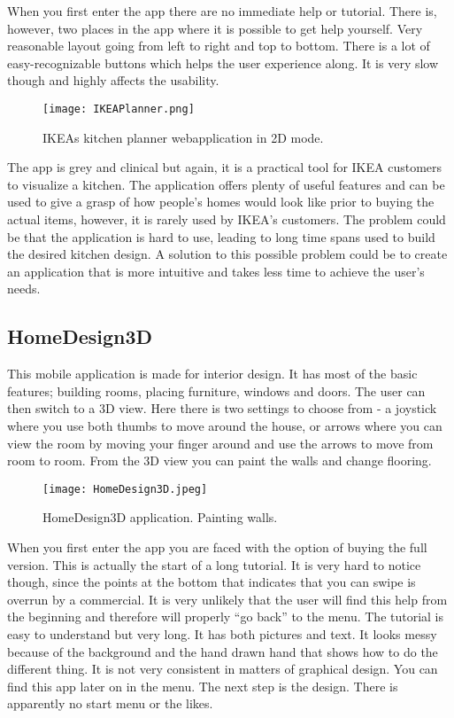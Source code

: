 When you first enter the app there are no immediate help or tutorial. There is, however, two places in the app where it is possible to get help yourself. Very reasonable layout going from left to right and top to bottom.  There is a lot of easy-recognizable buttons which helps the user experience along. 
It is very slow though and highly affects the usability. 

\begin{figure}[H]
\centering
\texttt{[image: IKEAPlanner.png]}
\caption{IKEAs kitchen planner webapplication in 2D mode.}
\end{figure}

The app is grey and clinical but again, it is a practical tool for IKEA customers to visualize a kitchen. 
The application offers plenty of useful features and can be used to give a grasp of how people’s homes would look like prior to buying the actual items, however, it is rarely used by IKEA’s customers. The problem could be that the application is hard to use, leading to long time spans used to build the desired kitchen design. A solution to this possible problem could be to create an application that is more intuitive and takes less time to achieve the user’s needs.

\subsection{HomeDesign3D}
This mobile application is made for interior design. It has most of the basic features; building rooms, placing furniture, windows and doors. The user can then switch to a 3D view. Here there is two settings to choose from - a joystick where you use both thumbs to move around the house, or arrows where you can view the room by moving your finger around and use the arrows to move from room to room. From the 3D view you can paint the walls and change flooring.

\begin{figure}[H]
\centering
\texttt{[image: HomeDesign3D.jpeg]}
\caption{HomeDesign3D application. Painting walls.}
\end{figure}

When you first enter the app you are faced with the option of buying the full version. This is actually the start of a long tutorial. It is very hard to notice though, since the points at the bottom that indicates that you can swipe is overrun by a commercial. It is very unlikely that the user will find this help from the beginning and therefore will properly “go back” to the menu. The tutorial is easy to understand but very long. It has both pictures and text. It looks messy because of the background and the hand drawn hand that shows how to do the different thing. It is not very consistent in matters of graphical design. 
You can find this app later on in the menu. 
The next step is the design. There is apparently no start menu or the likes. 

